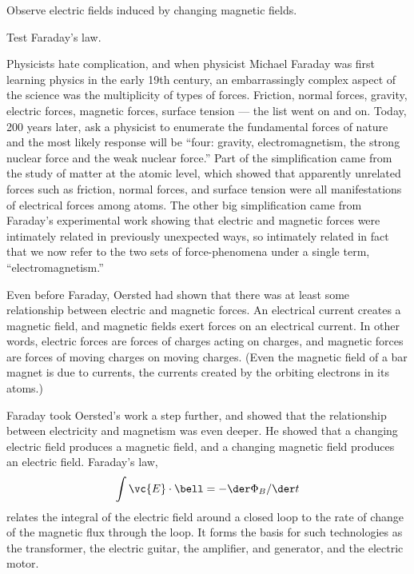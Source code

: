 \label{lab:faraday}

\apparatus
{}

\begin{goals}

\item[] Observe electric fields induced by changing magnetic fields.

\item[] Test Faraday's law.
\end{goals}

\introduction

Physicists hate complication, and when physicist Mi\-ch\-a\-el
Faraday was first learning physics in the early 19th
century, an embarrassingly complex aspect of the science was
the multiplicity of types of forces. Friction, normal
forces, gravity, electric forces, magnetic forces, surface
tension --- the list went on and on. Today, 200 years later,
ask a physicist to enumerate the fundamental forces of
nature and the most likely response will be ``four: gravity,
electromagnetism, the strong nuclear force and the weak
nuclear force.'' Part of the simplification came from the
study of matter at the atomic level, which showed that
apparently unrelated forces such as friction, normal forces,
and surface tension were all manifestations of electrical
forces among atoms. The other big simplification came from
Faraday's experimental work showing that electric and
magnetic forces were intimately related in previously
unexpected ways, so intimately related in fact that we now
refer to the two sets of force-phenomena under a single
term, ``electromagnetism.''

Even before Faraday, Oersted had shown that there was at
least some relationship between electric and magnetic
forces. An electrical current creates a magnetic field, and
magnetic fields exert forces on an electrical current. In
other words, electric forces are forces of charges acting on
charges, and magnetic forces are forces of moving charges on
moving charges. (Even the magnetic field of a bar magnet is
due to currents, the currents created by the orbiting
electrons in its atoms.)

Faraday took Oersted's work a step further, and showed that
the relationship between electricity and magnetism was even
deeper. He showed that a changing electric field produces a
magnetic field, and a changing magnetic field produces an
electric field. Faraday's law,
\begin{equation*}
      \int \vc{E}\cdot\bell  =  -\der\Phi_B/\der t  
\end{equation*}
relates the integral of the electric field around a
closed loop to the rate of change of the magnetic flux
through the loop. It forms the basis for such technologies
as the transformer, the electric guitar, the amplifier, and
generator, and the electric motor.

